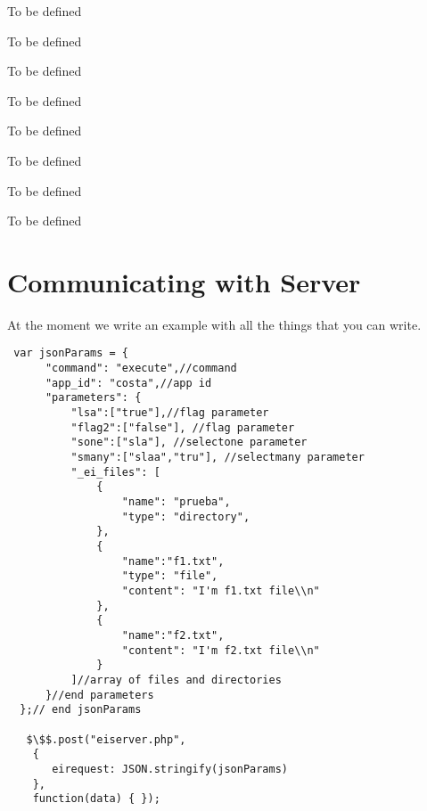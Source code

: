 \noindent
{}

To be defined

\noindent
{}

To be defined

\noindent
{}

To be defined

\noindent
{}

To be defined

\noindent
{}

To be defined

\noindent
{}

To be defined

\noindent
{}

To be defined

\noindent
{}

To be defined

\section{Communicating with \ei Server}
\label{ch:server:protocol}

At the moment we write an example with
 all the things that you can write.

\begin{lstlisting}
 var jsonParams = {
      "command": "execute",//command
      "app_id": "costa",//app id
      "parameters": {
          "lsa":["true"],//flag parameter
          "flag2":["false"], //flag parameter
          "sone":["sla"], //selectone parameter
          "smany":["slaa","tru"], //selectmany parameter
          "_ei_files": [
              {
                  "name": "prueba",
                  "type": "directory",
              },
              {
                  "name":"f1.txt",
                  "type": "file",
                  "content": "I'm f1.txt file\\n"
              },
              {
                  "name":"f2.txt",
                  "content": "I'm f2.txt file\\n"
              }
          ]//array of files and directories
      }//end parameters
  };// end jsonParams

   $\$$.post("eiserver.php",
    {
       eirequest: JSON.stringify(jsonParams)
    },
    function(data) { });
\end{lstlisting}

